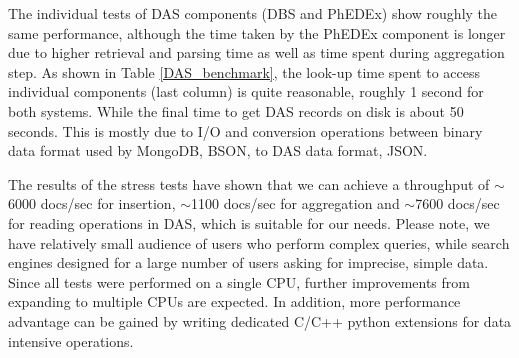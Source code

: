 \documentclass[1p,times]{elsarticle}
\begin{document}
%

The individual tests of DAS components (DBS and PhEDEx) show roughly 
the same performance, although the time taken by the PhEDEx component is longer
due to higher retrieval and parsing time as well as time spent
during aggregation step. As shown in Table \ref{DAS_benchmark},
the look-up time spent to access individual components (last column) is quite
reasonable, roughly 1 second for both systems. While the final time to
get DAS records on disk is about 50 seconds. This is mostly due to I/O and
conversion operations between binary data format used by MongoDB, BSON, to DAS
data format, JSON.

The results of the stress tests have shown that we can achieve a throughput of
$\sim$6000 docs/sec for insertion, $\sim$1100 docs/sec for aggregation and 
$\sim$7600 docs/sec for reading operations in DAS, which is suitable for our 
needs. Please note, we have relatively small audience of users
who perform complex queries, while search engines designed for
a large number of users asking for imprecise, simple data.
Since all tests were performed on a single CPU, further improvements from
expanding to multiple CPUs are expected. In addition, more
performance advantage can be gained by writing dedicated C/C++
python extensions for data intensive operations.
\end{document}
